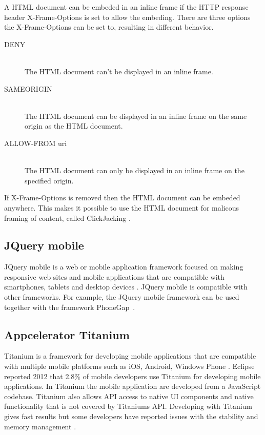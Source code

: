 A HTML document can be embeded in an inline frame if the HTTP response header X-Frame-Options is set to allow the embeding. There are three options the X-Frame-Options can be set to, resulting in different behavior. 
\begin{description}
 \item[DENY] \hfill \\
	The HTML document can't be displayed in an inline frame. 
\item[SAMEORIGIN] \hfill \\
	The HTML document can be displayed in an inline frame on the same origin as the HTML document. 
\item[ALLOW-FROM uri] \hfill \\
	The HTML document can only be displayed in an inline frame on the specified origin. 
\end{description}

If X-Frame-Options is removed then the HTML document can be embeded anywhere. This makes it possible to use the HTML document for malicous framing of content, called ClickJacking \cite{law2010}.

\subsection{JQuery mobile}\label{subsec:jquery-mobile}
JQuery mobile is a web or mobile application framework focused on making responsive web sites and mobile applications that are compatible with smartphones, tablets and desktop devices \cite{jquery-mobile15}. JQuery mobile is compatible with other frameworks. For example, the JQuery mobile framework can be used together with the framework PhoneGap~\cite{tech-republic-jquery-mobile-compatible14}. 

\subsection{Appcelerator Titanium}\label{subsec:appcelerator-titanium}
Titanium is a framework for developing mobile applications that are compatible with multiple mobile platforms such as iOS, Android, Windows Phone \cite{titanium15}. Eclipse reported 2012 that 2.8\% of mobile developers use Titanium for developing mobile applications. In Titanium the mobile application are developed from a JavaScript codebase. Titanium also allows API access to native UI components and native functionality that is not covered by Titaniums API. Developing with Titanium gives fast results but some developers have reported issues with the stability and memory management \cite{stay-away1-titanium15} \cite{stay-away2-titanium15}. 


